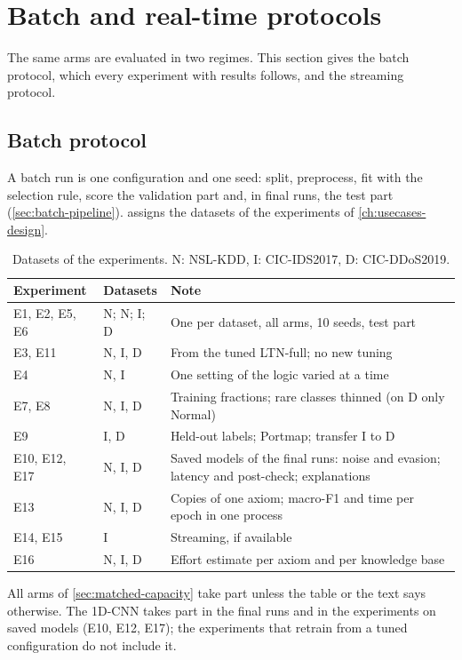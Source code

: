 \section{Batch and real-time protocols}
\label{sec:protocols}

The same arms are evaluated in two regimes. This section gives the batch protocol, which
every experiment with results follows, and the streaming protocol.

\subsection{Batch protocol}
\label{sec:batch-protocol}

A batch run is one configuration and one seed: split, preprocess, fit with the selection
rule, score the validation part and, in final runs, the test part (\cref{sec:batch-pipeline}).
 assigns the datasets of the experiments of \cref{ch:usecases-design}.
\begin{table}[t]
\centering
\footnotesize
\caption{Datasets of the experiments. N: NSL-KDD, I: CIC-IDS2017, D: CIC-DDoS2019.}
\label{tab:experiment-data}
\setlength{\tabcolsep}{4pt}
\begin{tabular}{@{}p{3.2cm}p{1.7cm}p{7.6cm}@{}}
\toprule
Experiment & Datasets & Note \\
\midrule
E1, E2, E5, E6 & N; N; I; D & One per dataset, all arms, 10 seeds, test part \\
E3, E11 & N, I, D & From the tuned LTN-full; no new tuning \\
E4 & N, I & One setting of the logic varied at a time \\
E7, E8 & N, I, D & Training fractions; rare classes thinned (on D only Normal) \\
E9 & I, D & Held-out labels; Portmap; transfer I to D \\
E10, E12, E17 & N, I, D & Saved models of the final runs: noise and evasion; latency and post-check; explanations \\
E13 & N, I, D & Copies of one axiom; macro-F1 and time per epoch in one process \\
E14, E15 & I & Streaming, if available \\
E16 & N, I, D & Effort estimate per axiom and per knowledge base \\
\bottomrule
\end{tabular}
\end{table}
All arms of \cref{sec:matched-capacity} take part unless the table or the text says otherwise. The
1D-CNN takes part in the final runs and in the experiments on saved models (E10, E12, E17); the
experiments that retrain from a tuned configuration do not include it.


